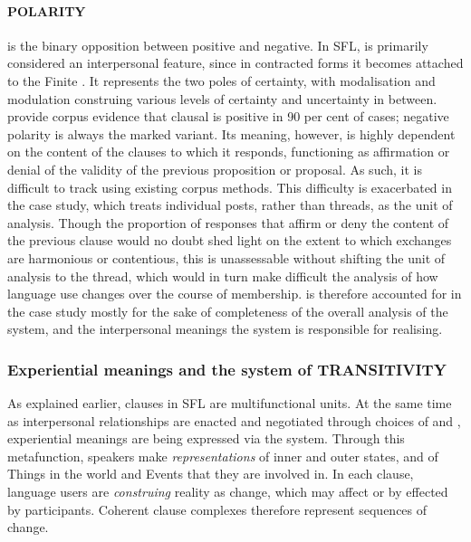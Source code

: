 \paragraph{POLARITY}

 is the binary opposition between positive and negative. In \gls{SFL},  is primarily considered an interpersonal feature, since in contracted forms it becomes attached to the Finite \cite[p.~143]{halliday_introduction_2004}. It represents the two poles of certainty, with modalisation and modulation construing various levels of certainty and uncertainty in between. \textcite{halliday_introduction_2004} provide corpus evidence that clausal  is positive in 90 per cent of cases; negative polarity is always the marked variant. Its meaning, however, is highly dependent on the content of the clauses to which it responds, functioning as affirmation or denial of the validity of the previous proposition or proposal. As such, it is difficult to track using existing corpus methods. This difficulty is exacerbated in the case study, which treats individual \glspl{post}, rather than \glspl{thread}, as the unit of analysis. Though the proportion of responses that affirm or deny the content of the previous clause would no doubt shed light on the extent to which exchanges are harmonious or contentious, this is unassessable without shifting the unit of analysis to the \gls{thread}, which would in turn make difficult the analysis of how language use changes over the course of membership.  is therefore accounted for in the case study mostly for the sake of completeness of the overall analysis of the  system, and the interpersonal meanings the system is responsible for realising.

\subsubsection{Experiential meanings and the system of TRANSITIVITY} \label{sect:trans}

As explained earlier, clauses in \gls{SFL} are multifunctional units. At the same time as interpersonal relationships are enacted and negotiated through choices of  and , experiential meanings are being expressed via the  system. Through this metafunction, speakers make \emph{representations} of inner and outer states, and of Things in the world and Events that they are involved in. In each clause, language users are \emph{construing} reality as change, which may affect or by effected by participants. Coherent clause complexes therefore represent sequences of change.

